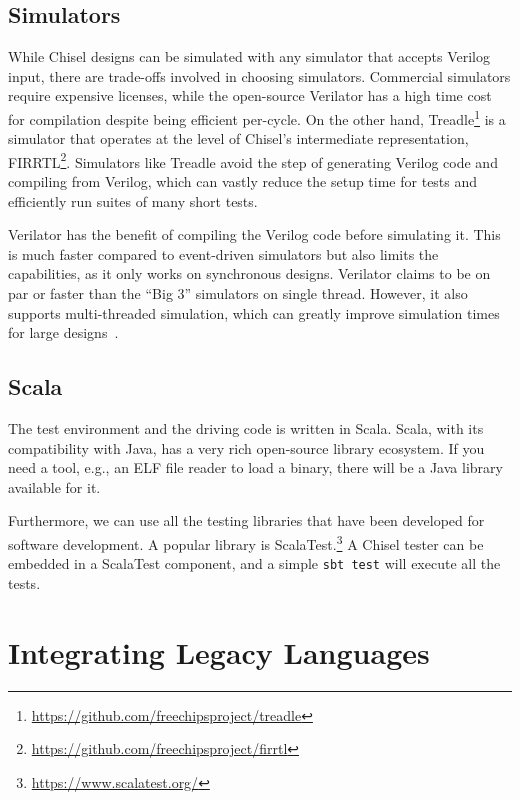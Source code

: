 \documentclass[conference]{IEEEtran}
\newcommand{\code}[1]{{\small{\texttt{#1}}}}
\newcommand{\todo}[1]{{\color{olive} TODO: #1}}
\newcommand{\martin}[1]{{\color{blue} Martin: #1}}
\renewcommand{\todo}[1]{}
\renewcommand{\martin}[1]{}
\begin{document}
\subsection{Simulators}

While Chisel designs can be simulated with any simulator that accepts Verilog input, there are trade-offs involved in choosing simulators.
Commercial simulators require expensive licenses, while the open-source Verilator has a high time cost for compilation despite being efficient per-cycle.
On the other hand, Treadle\footnote{\url{https://github.com/freechipsproject/treadle}} is a simulator that operates at the level of Chisel's intermediate representation, FIRRTL\footnote{\url{https://github.com/freechipsproject/firrtl}}.
Simulators like Treadle avoid the step of generating Verilog code and compiling from Verilog, which can vastly reduce the setup time for tests and efficiently run suites of many short tests.

Verilator has the benefit of compiling the Verilog code before simulating it. This is much faster compared to event-driven simulators but also limits the capabilities, as it only works on synchronous designs. Verilator claims to be on par or faster than the ``Big 3'' simulators on single thread. However, it also supports multi-threaded simulation, which can greatly improve simulation times for large designs~\cite{verilator}.

\martin{Maybe a few words from Richard on Treadle, Simon on Verilator?}


\subsection{Scala}

The test environment and the driving code is written in Scala. Scala, with its
compatibility with Java, has a very rich open-source library ecosystem.
If you need a tool, e.g., an ELF file reader to load a binary, there will be a Java
library available for it.

Furthermore, we can use all the testing libraries that have been developed for
software development. A popular library is ScalaTest.\footnote{\url{https://www.scalatest.org/}}
A Chisel tester can be embedded
in a ScalaTest component, and a simple \code{sbt test} will execute all the tests.

\todo{Check what ScalaCheck can offer.}

\section{Integrating Legacy Languages}
\label{sec:legacy}
\end{document}
